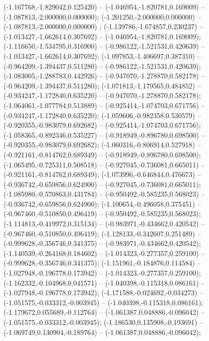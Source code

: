  (-1.167768,-1.829042,0.125420) -- (-1.046954,-1.820781,0.169009) -- (-1.087813,-2.000000,0.000000);
 (-1.201250,-2.000000,0.000000) -- (-1.087813,-2.000000,0.000000) ;
 (-1.139786,-1.674857,0.230237) -- (-1.013427,-1.662614,0.307692) -- (-1.046954,-1.820781,0.169009);
 (-1.116650,-1.534795,0.316900) -- (-0.986122,-1.521531,0.420639) -- (-1.013427,-1.662614,0.307692);
 (-1.097853,-1.406697,0.387310) -- (-0.964209,-1.394437,0.511280) -- (-0.986122,-1.521531,0.420639);
 (-1.083005,-1.288783,0.442926) -- (-0.947070,-1.278870,0.582178) -- (-0.964209,-1.394437,0.511280);
 (-1.071813,-1.179565,0.484852) -- (-0.934247,-1.172840,0.635220) -- (-0.947070,-1.278870,0.582178);
 (-1.064061,-1.077784,0.513889) -- (-0.925414,-1.074703,0.671756) -- (-0.934247,-1.172840,0.635220);
 (-1.059606,-0.982358,0.530579) -- (-0.920355,-0.983079,0.692682) -- (-0.925414,-1.074703,0.671756);
 (-1.058365,-0.892346,0.535227) -- (-0.918949,-0.896780,0.698500) -- (-0.920355,-0.983079,0.692682);
 (-1.060316,-0.806914,0.527918) -- (-0.921161,-0.814762,0.689349) -- (-0.918949,-0.896780,0.698500);
 (-1.065495,-0.725311,0.508518) -- (-0.927045,-0.736081,0.665011) -- (-0.921161,-0.814762,0.689349);
 (-1.073996,-0.646844,0.476673) -- (-0.936742,-0.659856,0.624900) -- (-0.927045,-0.736081,0.665011);
 (-1.085980,-0.570863,0.431784) -- (-0.950492,-0.585235,0.568023) -- (-0.936742,-0.659856,0.624900);
 (-1.100654,-0.496058,0.375451) -- (-0.967460,-0.510850,0.496419) -- (-0.950492,-0.585235,0.568023);
 (-1.114813,-0.419972,0.315134) -- (-0.983971,-0.434662,0.420542) -- (-0.967460,-0.510850,0.496419);
 (-1.128133,-0.342607,0.251489) -- (-0.999628,-0.356746,0.341375) -- (-0.983971,-0.434662,0.420542);
 (-1.140539,-0.264168,0.184602) -- (-1.014323,-0.277357,0.259100) -- (-0.999628,-0.356746,0.341375);
 (-1.151961,-0.184876,0.114584) -- (-1.027948,-0.196778,0.173942) -- (-1.014323,-0.277357,0.259100);
 (-1.162332,-0.104968,0.041571) -- (-1.040398,-0.115318,0.086161) -- (-1.027948,-0.196778,0.173942);
 (-1.171588,-0.024692,-0.034273) -- (-1.051575,-0.033312,-0.003945) -- (-1.040398,-0.115318,0.086161);
 (-1.179672,0.055689,-0.112764) -- (-1.061387,0.048886,-0.096042) -- (-1.051575,-0.033312,-0.003945);
 (-1.186530,0.135908,-0.193691) -- (-1.069749,0.130904,-0.189764) -- (-1.061387,0.048886,-0.096042);
